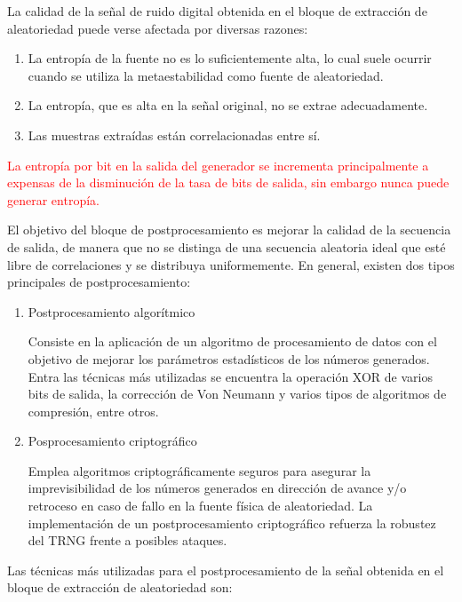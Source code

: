             La calidad de la señal de ruido digital obtenida en el bloque de extracción de aleatoriedad puede verse afectada por diversas razones:

            \begin{enumerate}[noitemsep, label=(\alph*)]
                \item La entropía de la fuente no es lo suficientemente alta, lo cual suele ocurrir cuando se utiliza la metaestabilidad como fuente de aleatoriedad.
                \item La entropía, que es alta en la señal original, no se extrae adecuadamente.
                \item Las muestras extraídas están correlacionadas entre sí. 
            \end{enumerate}		

            \textcolor{red}{La entropía por bit en la salida del generador se incrementa principalmente a expensas de la disminución de la tasa de bits de salida, sin embargo nunca puede generar entropía.}
	
	        El objetivo del bloque de postprocesamiento es mejorar la calidad de la secuencia de salida, de manera que no se distinga de una secuencia aleatoria ideal que esté libre de correlaciones y se distribuya uniformemente. En general, existen dos tipos principales de postprocesamiento:

            \begin{enumerate}
                \item Postprocesamiento algorítmico

                    Consiste en la aplicación de un algoritmo de procesamiento de datos con el objetivo de mejorar los parámetros estadísticos de los números generados. Entra las técnicas más utilizadas se encuentra la operación XOR de varios bits de salida, la corrección de Von Neumann y varios tipos de algoritmos de compresión, entre otros.
                \item Posprocesamiento criptográfico 

                    Emplea algoritmos criptográficamente seguros para asegurar la imprevisibilidad de los números generados en dirección de avance y/o retroceso en caso de fallo en la fuente física de aleatoriedad. La implementación de un postprocesamiento criptográfico refuerza la robustez del TRNG frente a posibles ataques.
            \end{enumerate}
    
            Las técnicas más utilizadas para el postprocesamiento de la señal obtenida en el bloque de extracción de aleatoriedad son: 
	
